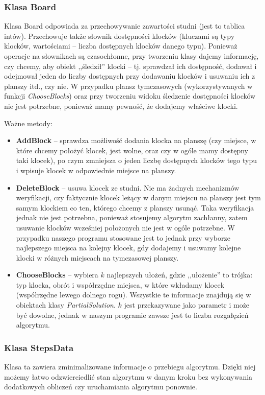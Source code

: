 \documentclass{article}
\begin{document}
\subsubsection{Klasa Board}
Klasa Board odpowiada za przechowywanie zawartości studni (jest to tablica intów). Przechowuje także słownik dostępności klocków (kluczami są typy klocków, wartościami -- liczba dostępnych klocków danego typu). Ponieważ operacje na słownikach są czasochłonne, przy tworzeniu klasy dajemy informację, czy chcemy, aby obiekt ,,śledził'' klocki -- tj. sprawdzał ich dostępność, dodawał i odejmował jeden do liczby dostępnych przy dodawaniu klocków i usuwaniu ich z planszy itd., czy nie. W przypadku plansz tymczasowych (wykorzystywanych w funkcji \textit{ChooseBlocks}) oraz przy tworzeniu widoku śledzenie dostępności klocków nie jest potrzebne, ponieważ mamy pewność, że dodajemy właściwe klocki.



Ważne metody:
\begin{itemize}
\item \textbf{AddBlock} -- sprawdza możliwość dodania klocka na planszę (czy miejsce, w które chcemy położyć klocek, jest wolne, oraz czy w ogóle mamy dostępny taki klocek), po czym zmniejsza o jeden liczbę dostępnych klocków tego typu i wpisuje klocek w odpowiednie miejsce na planszy.
\item \textbf{DeleteBlock} -- usuwa klocek ze studni. Nie ma żadnych mechanizmów weryfikacji, czy faktycznie klocek leżący w danym miejscu na planszy jest tym samym klockiem co ten, którego chcemy z planszy usunąć. Taka weryfikacja jednak nie jest potrzebna, ponieważ stosujemy algorytm zachłanny, zatem usuwanie klocków wcześniej położonych nie jest w ogóle potrzebne. W przypadku naszego programu stosowane jest to jednak przy wyborze najlepszego miejsca na kolejny klocek, gdy dodajemy i usuwamy kolejne klocki w różnych miejscach na tymczasowej planszy.
\item \textbf{ChooseBlocks} -- wybiera $k$ najlepszych ułożeń, gdzie ,,ułożenie'' to trójka: typ klocka, obrót i współrzędne miejsca, w które wkładamy klocek (współrzędne lewego dolnego rogu). Wszystkie te informacje znajdują się w obiektach klasy \textit{PartialSolution}. $k$ jest przekazywane jako parametr i może być dowolne, jednak w naszym programie zawsze jest to liczba rozgałęzień algorytmu.
\end{itemize}

\subsubsection{Klasa StepsData}
\label{ref:stepsdata}
Klasa ta zawiera zminimalizowane informacje o przebiegu algorytmu. Dzięki niej możemy łatwo odzwierciedlić stan algorytmu w danym kroku bez wykonywania dodatkowych obliczeń czy uruchamiania algorytmu ponownie.
\end{document}
